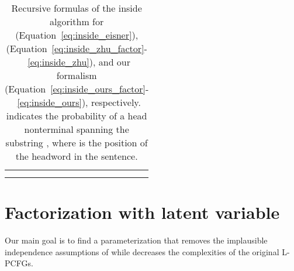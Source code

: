 \documentclass[11pt,a4paper]{article}
\begin{document}
\begin{table*}[!ht]
	\centering
	{\setlength{\tabcolsep}{.0em}
		\begin{tabular}{l}
			\toprule 
			\begin{minipage}{\linewidth}
				\vspace{-.5em}\small
				{}
				\vspace{-.5em}
			\end{minipage}\\
			\toprule 
			\begin{minipage}{\linewidth}
				\vspace{-.5em}\small
				{}
				\vspace{-.5em}
			\end{minipage}\\
			\toprule
			\begin{minipage}{\linewidth}
				\vspace{-.5em}\small
				{}
				\vspace{-.5em}
			\end{minipage}\\
			\bottomrule
	\end{tabular}}
	\caption{
		\label{tab:inside_equations}
		Recursive formulas of the inside algorithm for \citet{eisner-satta-1999-efficient} (Equation~\ref{eq:inside_eisner}), \citet{zhu-etal-2020-return} (Equation~\ref{eq:inside_zhu_factor}-~\ref{eq:inside_zhu}), and our formalism (Equation~\ref{eq:inside_ours_factor}-~\ref{eq:inside_ours}), respectively.  indicates the probability of a head nonterminal  spanning the substring , where  is the position of the headword in the sentence.
	}
\end{table*}







\section{Factorization with latent variable}

Our main goal is to find a parameterization that removes the implausible independence assumptions of \citet{zhu-etal-2020-return} while decreases the complexities of the original L-PCFGs.
\end{document}

